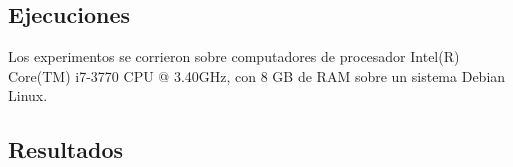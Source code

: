 \documentclass[11pt]{article}
\begin{document}
\begin{table}[h]
\caption{Parámetros usados en metaheurísticas}
\label{tabla:2}
\end{table}

\subsection{Ejecuciones}
Los experimentos se corrieron sobre computadores de procesador Intel(R) Core(TM) i7-3770 CPU @ 3.40GHz, con 8 GB de RAM sobre un sistema Debian Linux.

\clearpage

\subsection{Resultados}
    
\end{document}

